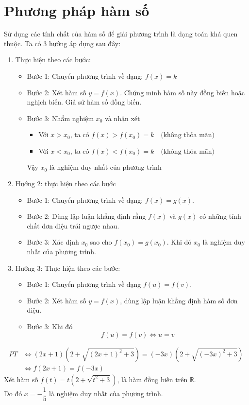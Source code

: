 \section{Phương pháp hàm số}
Sử dụng các tính chất của hàm số để giải phương trình là dạng toán khá quen thuộc. Ta có 3 hướng áp dụng sau đây:
\begin{enumerate}
\item Thực hiện theo các bước:
\begin{itemize}
\item Bước 1: Chuyển phương trình về dạng: $f(x) = k$
\item Bước 2: Xét hàm số $y=f(x)$. Chứng minh hàm số này đồng biến hoặc nghịch biến. Giả sử hàm số đồng biến.
\item Bước 3: Nhẩm nghiệm $x_0$ và nhận xét
\begin{itemize}
\item Với $x> x_0$, ta có 
$f(x) > f(x_0 ) = k \quad \text{(không thỏa mãn)}$
\item Với $x < x_0$, ta có 
$f(x) < f(x_0 ) = k \quad \text{(không thỏa mãn)}$
\end{itemize}
Vậy $x_0$ là nghiệm duy nhất của phương trình
\end{itemize}
\item Hướng 2: thực hiện theo các bước
\begin{itemize}
\item Bước 1: Chuyển phương trình về dạng: $f(x)=g(x)$.
\item Bước 2: Dùng lập luận khẳng định rằng $f(x)$ và $g(x)$ có những tính chất đơn điệu trái ngược nhau.
\item Bước 3: Xác định $x_0$ sao cho $
f(x_0 ) = g(x_0 )
$. Khi đó $x_0$ là nghiệm duy nhất của phương trình.
\end{itemize}
\item Hướng 3: Thực hiện theo các bước:
\begin{itemize}
\item Bước 1: Chuyển phương trình về dạng $f(u)=f(v)$.
\item Bước 2: Xét hàm số $y=f(x)$, dùng lập luận khẳng định hàm số đơn điệu.
\item Bước 3: Khi đó 
$$
f(u) = f(v) \Leftrightarrow u = v
$$
\end{itemize}
\end{enumerate}
\hda
\begin{align*}
PT & \Leftrightarrow \left( {2x + 1} \right)\left( {2 + \sqrt {\left( {2x + 1} \right)^2 + 3} } \right) = \left( { - 3x} \right)\left( {2 + \sqrt {\left( { - 3x} \right)^2 + 3} } \right)\\ 
& \Leftrightarrow  f\left( {2x + 1} \right) = f\left( { - 3x} \right) 
\end{align*}
Xét hàm số $f\left( t \right) = t\left( {2 + \sqrt {t^2 + 3} } \right)$, là hàm đồng biến trên $\mathbb{R}$.\\
Do đó $x = - \dfrac{1}{5}$ là nghiệm duy nhất của phương trình.\\
